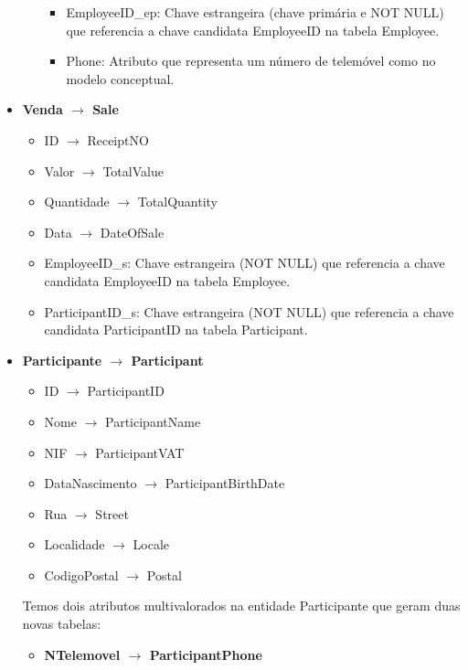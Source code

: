 \documentclass[a4paper,12pt]{scrreprt}
\begin{document}
\begin{itemize}
\begin{itemize}
\begin{itemize}
                        \item{EmployeeID\_ep:} Chave estrangeira (chave primária e NOT NULL) que referencia a chave candidata EmployeeID na tabela Employee.
                        \item{Phone:} Atributo que representa um número de telemóvel como no modelo conceptual.
                    \end{itemize}
            \end{itemize}
        \item{\textbf{Venda $\rightarrow$ Sale}}
            \begin{itemize}
                \item{ID $\rightarrow$ ReceiptNO}
                \item{Valor $\rightarrow$ TotalValue}
                \item{Quantidade $\rightarrow$ TotalQuantity}
                \item{Data $\rightarrow$ DateOfSale}
                \item{EmployeeID\_s:} Chave estrangeira (NOT NULL) que referencia a chave candidata EmployeeID na tabela Employee.
                \item{ParticipantID\_s:} Chave estrangeira (NOT NULL) que referencia a chave candidata ParticipantID na tabela Participant.
            \end{itemize}
        \item{\textbf{Participante $\rightarrow$ Participant}}
            \begin{itemize}
                \item{ID $\rightarrow$ ParticipantID}
                \item{Nome $\rightarrow$ ParticipantName}
                \item{NIF $\rightarrow$ ParticipantVAT}
                \item{DataNascimento $\rightarrow$ ParticipantBirthDate}
                \item{Rua $\rightarrow$ Street}
                \item{Localidade $\rightarrow$ Locale}
                \item{CodigoPostal $\rightarrow$ Postal}
            \end{itemize}
            Temos dois atributos multivalorados na entidade Participante que geram duas novas tabelas:
            \begin{itemize}
                \item{\textbf{NTelemovel $\rightarrow$ ParticipantPhone}}

\end{itemize}
\end{itemize}
\end{document}
